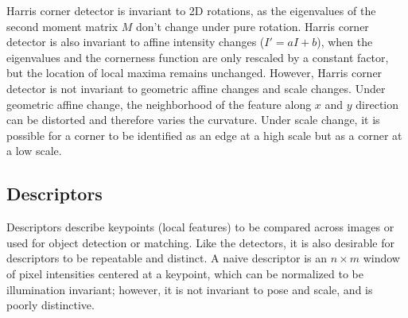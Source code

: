\documentclass[twoside]{article}
\begin{document}
Harris corner detector is invariant to 2D rotations, as the eigenvalues of the second moment matrix $M$ don't change under pure rotation. Harris corner detector is also invariant to affine intensity changes ($I' = aI+b$), when the eigenvalues and the cornerness function are only rescaled by a constant factor, but the location of local maxima remains unchanged. However, Harris corner detector is not invariant to geometric affine changes and scale changes. Under geometric affine change, the neighborhood of the feature along $x$ and $y$ direction can be distorted and therefore varies the curvature. Under scale change, it is possible for a corner to be identified as an edge at a high scale but as a corner at a low scale.

\subsection{Descriptors}
Descriptors describe keypoints (local features) to be compared across images or used for object detection or matching. Like the detectors, it is also desirable for descriptors to be repeatable and distinct. A naive descriptor is an $n\times m$ window of pixel intensities centered at a keypoint, which can be normalized to be illumination invariant; however, it is not invariant to pose and scale, and is poorly distinctive.
\end{document}
